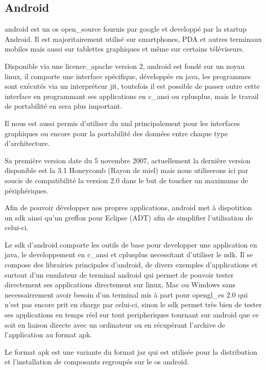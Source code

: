 \subsection{Android}

	\gls{android} est un \gls{os} \gls{open_source} fournis par \gls{google} et
	developpé par la startup Android.
	Il est majoritairement utilisé sur smartphones, PDA et autres terminaux
	mobiles mais aussi sur tablettes graphiques et même sur certains téléviseurs.
	
	Disponible via une \gls{licence_apache} version 2, \gls{android} est fondé  sur
	un noyau \gls{linux}, il comporte une interface spécifique, développée en \gls{java},
	les programmes sont exécutés via un interpréteur \gls{jit}, toutefois il est possible
	de passer outre cette interface en programmant ses applications en \gls{c_ansi} ou \gls{cplusplus},
	mais le travail de portabilité en sera plus important.
	
	Il nous est aussi permis d'utiliser du \gls{xml} principalement pour les interfaces
	graphiques ou encore pour la portabilité des données entre chaque type
	d'architecture.
	
	Sa première version date du 5 novembre 2007, actuellement la dernière version
	disponible est la 3.1 Honeycomb (Rayon de miel) mais nous utiliserons ici par
	soucis de compatibilité la version 2.0 dans le but de toucher un maximums de
	périphériques.
	
	Afin de pouvoir développer nos propres applications, \gls{android} met à
	dispotition un \gls{sdk} ainsi qu'un greffon pour Eclipse
	(ADT) afin de simplifier l'utilisation de celui-ci.
	
	Le \gls{sdk} d'\gls{android} comporte les outils de base pour developper une application en
	\gls{java}, le developpement en \gls{c_ansi} et \gls{cplusplus} necessitant d'utiliser le \gls{ndk}.
	Il se compose des librairies principales d'\gls{android}, de divers exemples
	d'applications et surtout d'un emulateur de terminal \gls{android} qui permet de
	pouvoir tester directement ses applications directement sur \gls{linux}, Mac ou
	Windows sans necessairrement avoir besoin d'un terminal mis à part pour
	\gls{opengl_es} 2.0 qui n'est pas encore prit en charge par celui-ci, sinon le \gls{sdk}
	permet très bien de tester ses applications en temps réel sur tout
	peripheriques tournant sur \gls{android} que ce soit en liaison directe avec un
	ordinateur ou en récupérant l'archive de l'application au format \gls{apk}.
	
	Le format \gls{apk} est une variante du format
	\gls{jar} qui est utilisée pour la distribution et l'installation de composants
	regroupés sur le \gls{os} \gls{android}.



